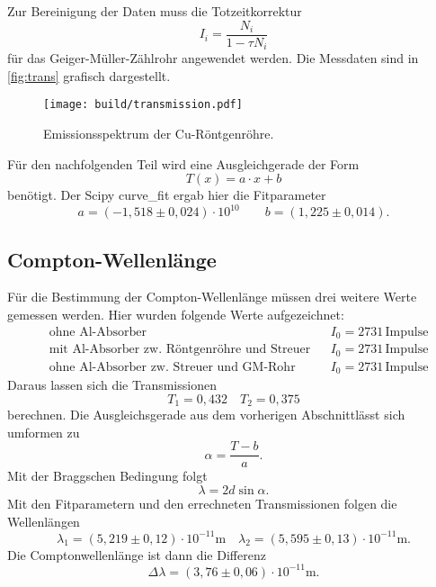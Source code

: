 Zur Bereinigung der Daten muss die Totzeitkorrektur 
\[
	I_i = \frac{N_i}{1 - \tau N_i}
\]
für das Geiger-Müller-Zählrohr angewendet werden.
Die Messdaten sind in \autoref{fig:trans} grafisch dargestellt.
\begin{figure}
	\centering
	\texttt{[image: build/transmission.pdf]}
	\caption{Emissionsspektrum der Cu-Röntgenröhre.}
	\label{fig:trans}
\end{figure}
Für den nachfolgenden Teil wird eine Ausgleichgerade der Form 
\[
	T(x) = a\cdot x + b
\]
benötigt. Der Scipy curve\_fit ergab hier die Fitparameter
\begin{equation}
	a = (-1,518 \pm 0,024) \cdot 10^{10}
	\qquad
	b = (1,225 \pm 0,014).
\end{equation}

\newpage
\subsection{Compton-Wellenlänge}
\label{sec:Compton-Wellenlänge}
Für die Bestimmung der Compton-Wellenlänge müssen drei weitere Werte gemessen werden. Hier
wurden folgende Werte aufgezeichnet:
\begin{align*}
	&\text{ohne Al-Absorber} & & I_0 = 2731 \, \text{Impulse} \\
	&\text{mit Al-Absorber zw. Röntgenröhre und Streuer} & & I_0 = 2731 \, \text{Impulse} \\
	&\text{ohne Al-Absorber zw. Streuer und GM-Rohr} & & I_0 = 2731 \, \text{Impulse}
\end{align*}
Daraus lassen sich die Transmissionen
\begin{equation}
	T_1 = 0,432 \quad
	T_2 = 0,375
\end{equation}
berechnen. Die Ausgleichsgerade aus dem vorherigen Abschnittlässt sich umformen zu
\[ \alpha = \frac{T - b}{a}. \]
Mit der Braggschen Bedingung folgt 
\[
	\lambda = 2d \sin\alpha.
\]
Mit den Fitparametern und den errechneten Transmissionen folgen die Wellenlängen
\begin{equation}
	\lambda_1 = (5,219 \pm 0,12) \cdot 10^{-11} \si{\meter}
	\quad
	\lambda_2 = (5,595 \pm 0,13) \cdot 10^{-11} \si{\meter}.
\end{equation}
Die Comptonwellenlänge ist dann die Differenz
\[
	\Delta \lambda = (3,76 \pm 0,06) \cdot 10^{-11} \si{\meter}.
\]
	

